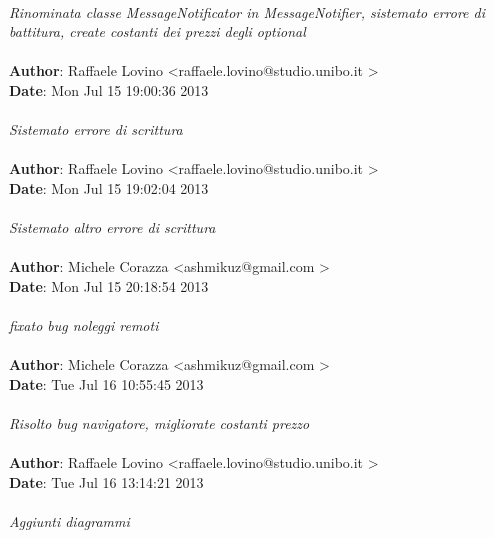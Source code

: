 \documentclass[a4paper,12pt]{article} %
\begin{document}
\\
    \emph{Rinominata classe MessageNotificator in MessageNotifier, sistemato errore di battitura, create costanti dei prezzi degli optional} \\
\\
\textbf{Author}: Raffaele Lovino \textless raffaele.lovino@studio.unibo.it \textgreater \\
\textbf{Date}:   Mon Jul 15 19:00:36 2013 \\
\\
    \emph{Sistemato errore di scrittura}\\
\\
\textbf{Author}: Raffaele Lovino \textless raffaele.lovino@studio.unibo.it \textgreater \\
\textbf{Date}:   Mon Jul 15 19:02:04 2013 \\
\\
    \emph{Sistemato altro errore di scrittura}\\
\\
\textbf{Author}: Michele Corazza \textless ashmikuz@gmail.com \textgreater \\
\textbf{Date}:   Mon Jul 15 20:18:54 2013 \\
\\
    \emph{fixato bug noleggi remoti}\\
\\
\textbf{Author}: Michele Corazza \textless ashmikuz@gmail.com \textgreater \\
\textbf{Date}:   Tue Jul 16 10:55:45 2013 \\
\\
    \emph{Risolto bug navigatore, migliorate costanti prezzo}\\
\\
\textbf{Author}: Raffaele Lovino \textless raffaele.lovino@studio.unibo.it \textgreater \\
\textbf{Date}:   Tue Jul 16 13:14:21 2013 \\
\\
    \emph{Aggiunti diagrammi}
\end{document}
